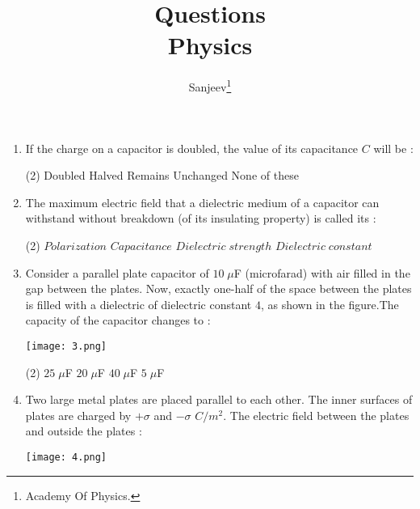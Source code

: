 \documentclass{article}
\title{
    Questions\\
    \vspace{0.2cm}
    \large Physics %
}
\author{Sanjeev\thanks{Academy Of Physics.}}
\date{}
\begin{document}
\maketitle
\begin{enumerate}
\item If the charge on a capacitor is doubled, the value of its capacitance \(C\) will be :
\begin{tasks}(2)
\task Doubled
\task Halved
\task Remains Unchanged
\task None of these
\end{tasks}
\item The maximum electric field that a dielectric medium of a capacitor can withstand without breakdown (of its insulating property) is called its :
\begin{tasks}(2)
\task \(Polarization\)
\task \(Capacitance\)
\task \(Dielectric \; strength\)
\task \(Dielectric \;constant\)
\end{tasks}
\item Consider a parallel plate capacitor of \(10\;\mu\)F (microfarad) with air filled in the gap between the plates. Now, exactly one-half of the space between the plates is filled with a dielectric of dielectric constant \(4\), as shown in the figure.The capacity of the capacitor changes to :

\texttt{[image: 3.png]}

\begin{tasks}(2)
\task \(25\;\mu\)F
\task \(20\;\mu\)F
\task \(40\;\mu\)F
\task \(5\;\mu\)F
\end{tasks}
\item Two large metal plates are placed parallel to each other. The inner surfaces of plates are charged by \(+ \sigma\) and \(- \sigma\) \(C/m^2\). The electric field between the plates and outside the plates :

\texttt{[image: 4.png]}


\end{enumerate}
\end{document}
